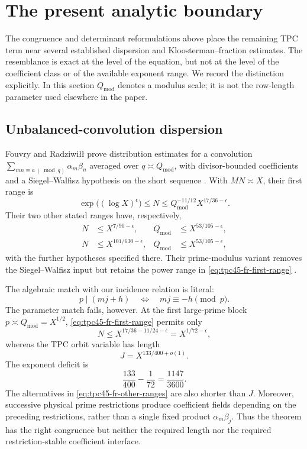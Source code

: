 \section{The present analytic boundary}
\label{sec:tpc45-literature}

The congruence and determinant reformulations above place the remaining
TPC term near several established dispersion and
Kloosterman--fraction estimates.  The resemblance is exact at the level
of the equation, but not at the level of the coefficient class or of the
available exponent range.  We record the distinction explicitly.  In
this section \(Q_{\mathrm{mod}}\) denotes a modulus scale; it is not the
row-length parameter used elsewhere in the paper.

\subsection{Unbalanced-convolution dispersion}

Fouvry and Radziwi{\l}{\l} prove distribution estimates for a convolution
\(
  \sum_{mn\equiv a\, (\bmod q)}\alpha_m\beta_n
\)
averaged over \(q\asymp Q_{\mathrm{mod}}\), with divisor-bounded
coefficients and a Siegel--Walfisz hypothesis on the short sequence
\cite[Corollary~1.1]{FR2022}.  With \(MN\asymp X\), their first range is
\begin{equation}
 \exp\!\bigl((\log X)^\epsilon\bigr)
 \le N
 \le Q_{\mathrm{mod}}^{-11/12}X^{17/36-\epsilon}.
 \label{eq:tpc45-fr-first-range}
\end{equation}
Their two other stated ranges have, respectively,
\begin{equation}
 \begin{aligned}
  N&\le X^{7/90-\epsilon},
  &Q_{\mathrm{mod}}&\le X^{53/105-\epsilon},\\
  N&\le X^{101/630-\epsilon},
  &Q_{\mathrm{mod}}&\le X^{53/105-\epsilon},
 \end{aligned}
 \label{eq:tpc45-fr-other-ranges}
\end{equation}
with the further hypotheses specified there.  Their prime-modulus
variant removes the Siegel--Walfisz input but retains the power range in
\eqref{eq:tpc45-fr-first-range} \cite[Theorem~1.2]{FR2022}.

The algebraic match with our incidence relation is literal:
\[
 p\mid(mj+h)
 \quad\Longleftrightarrow\quad
 mj\equiv-h\pmod p.
\]
The parameter match fails, however.  At the first large-prime block
\(p\asymp Q_{\mathrm{mod}}=X^{1/2}\),
\eqref{eq:tpc45-fr-first-range} permits only
\[
 N\le X^{17/36-11/24-\epsilon}
   =X^{1/72-\epsilon},
\]
whereas the TPC orbit variable has length
\[
 J=X^{133/400+o(1)}.
\]
The exponent deficit is
\begin{equation}
 \frac{133}{400}-\frac1{72}
 =\frac{1147}{3600}.
 \label{eq:tpc45-fr-exponent-deficit}
\end{equation}
The alternatives in \eqref{eq:tpc45-fr-other-ranges} are also shorter than
\(J\).  Moreover, successive physical prime restrictions produce
coefficient fields depending on the preceding restrictions, rather than
a single fixed product \(\alpha_m\beta_j\).  Thus the theorem has the
right congruence but neither the required length nor the required
restriction-stable coefficient interface.

